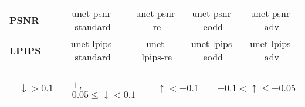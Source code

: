 \begin{table}[]
\begin{tabular}{ll|c|cccc}
    \multicolumn{2}{l|}{\textbf{PSNR}} & \cellcolor[HTML]{C0C0C0} & unet-psnr-standard & unet-psnr-re & unet-psnr-eodd & unet-psnr-adv \\
    \cline{1-2}
    
    \multicolumn{2}{l|}{\textbf{LPIPS}} & \cellcolor[HTML]{C0C0C0} & unet-lpips-standard & unet-lpips-re & unet-lpips-eodd & unet-lpips-adv \\
    \hline
    \end{tabular}
    
    \begin{tabular}{llllllll} 
        \cellcolor[HTML]{E6C321} & $ \downarrow > 0.1$ & 
        \cellcolor[HTML]{F1D892} &$+$, $0.05 \leq \downarrow < 0.1$ & 
        \cellcolor[HTML]{3089A2} & $\uparrow < -0.1$  & 
        \cellcolor[HTML]{93C1C9} & $-0.1 < \uparrow \leq -0.05$ \\
    \end{tabular}
\end{table}


